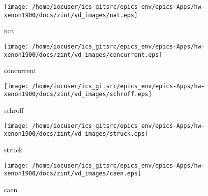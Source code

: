\noindent
\vspace{1.4cm}
\begin{minipage}{.2\textwidth}
\begin{center}
\texttt{[image: /home/iocuser/ics\_gitsrc/epics\_env/epics-Apps/hw-xenon1900/docs/zint/vd\_images/nat.eps]}
\end{center}
\end{minipage}
\begin{minipage}{.7\textwidth}
nat
\end{minipage}


\noindent
\vspace{1.4cm}
\begin{minipage}{.2\textwidth}
\begin{center}
\texttt{[image: /home/iocuser/ics\_gitsrc/epics\_env/epics-Apps/hw-xenon1900/docs/zint/vd\_images/concurrent.eps]}
\end{center}
\end{minipage}
\begin{minipage}{.7\textwidth}
concurrent
\end{minipage}


\noindent
\vspace{1.4cm}
\begin{minipage}{.2\textwidth}
\begin{center}
\texttt{[image: /home/iocuser/ics\_gitsrc/epics\_env/epics-Apps/hw-xenon1900/docs/zint/vd\_images/schroff.eps]}
\end{center}
\end{minipage}
\begin{minipage}{.7\textwidth}
schroff
\end{minipage}


\noindent
\vspace{1.4cm}
\begin{minipage}{.2\textwidth}
\begin{center}
\texttt{[image: /home/iocuser/ics\_gitsrc/epics\_env/epics-Apps/hw-xenon1900/docs/zint/vd\_images/struck.eps]}
\end{center}
\end{minipage}
\begin{minipage}{.7\textwidth}
struck
\end{minipage}


\noindent
\vspace{1.4cm}
\begin{minipage}{.2\textwidth}
\begin{center}
\texttt{[image: /home/iocuser/ics\_gitsrc/epics\_env/epics-Apps/hw-xenon1900/docs/zint/vd\_images/caen.eps]}
\end{center}
\end{minipage}
\begin{minipage}{.7\textwidth}
caen
\end{minipage}


